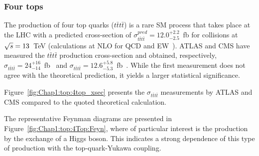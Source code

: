 \subsubsection{Four tops}
\label{sec:Chap1:Top:Production:4tops}
The production of four top quarks ($t\bar{t}t\bar{t}$) is a rare SM process that takes place at the LHC 
with a predicted cross-section of $\sigma^{pred}_{t\bar{t}t\bar{t}} = 12.0^{+2.2}_{-2.5}$~fb for \Pproton\Pproton
collisions at $\sqrt{s}=13$~TeV (calculations at NLO for QCD and EW~\cite{Frederix:2017wme}). 
ATLAS and CMS have measured the $t\bar{t}t\bar{t}$ production cross-section and obtained,
respectively, $\sigma_{t\bar{t}t\bar{t}} = 24^{+16}_{-14}$~fb~\cite{ATLAS:2021kqb} and 
$\sigma_{t\bar{t}t\bar{t}} = 12.6^{+5.8}_{-5.3}$~fb~\cite{CMS:2019rvj}.
While the first measurement does not agree with the theoretical prediction, 
it yields a larger statistical significance. 

Figure~\ref{fig:Chap1:top:4top_xsec} presents the $\sigma_{t\bar{t}t\bar{t}}$ measurements 
by ATLAS and CMS compared to the quoted theoretical calculation. 

The representative Feynman diagrams are presented in Figure~\ref{fig:Chap1:top:4Top:Feyn}, 
where of particular interest is the production by the exchange of a Higgs boson. 
This indicates a strong dependence of this type of production
with the top-quark-Yukawa coupling.

